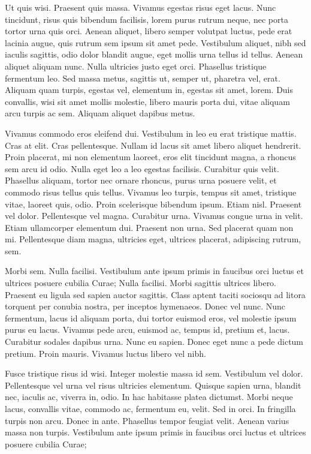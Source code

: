 \documentclass{article}
\begin{document}
Ut quis wisi. Praesent quis massa. Vivamus egestas risus eget lacus. Nunc
tincidunt, risus quis bibendum facilisis, lorem purus rutrum neque, nec porta
tortor urna quis orci. Aenean aliquet, libero semper volutpat luctus, pede erat
lacinia augue, quis rutrum sem ipsum sit amet pede. Vestibulum aliquet, nibh
sed iaculis sagittis, odio dolor blandit augue, eget mollis urna tellus id
tellus. Aenean aliquet aliquam nunc. Nulla ultricies justo eget orci. Phasellus
tristique fermentum leo. Sed massa metus, sagittis ut, semper ut, pharetra vel,
erat. Aliquam quam turpis, egestas vel, elementum in, egestas sit amet, lorem.
Duis convallis, wisi sit amet mollis molestie, libero mauris porta dui, vitae
aliquam arcu turpis ac sem. Aliquam aliquet dapibus metus.

Vivamus commodo eros eleifend dui. Vestibulum in leo eu erat tristique
mattis. Cras at elit. Cras pellentesque. Nullam id lacus sit amet libero
aliquet hendrerit. Proin placerat, mi non elementum laoreet, eros elit
tincidunt magna, a rhoncus sem arcu id odio. Nulla eget leo a leo egestas
facilisis. Curabitur quis velit. Phasellus aliquam, tortor nec ornare rhoncus,
purus urna posuere velit, et commodo risus tellus quis tellus. Vivamus leo
turpis, tempus sit amet, tristique vitae, laoreet quis, odio. Proin scelerisque
bibendum ipsum. Etiam nisl. Praesent vel dolor. Pellentesque vel magna.
Curabitur urna. Vivamus congue urna in velit. Etiam ullamcorper elementum dui.
Praesent non urna. Sed placerat quam non mi. Pellentesque diam magna, ultricies
eget, ultrices placerat, adipiscing rutrum, sem.

Morbi sem. Nulla facilisi. Vestibulum ante ipsum primis in faucibus orci
luctus et ultrices posuere cubilia Curae; Nulla facilisi. Morbi sagittis
ultrices libero. Praesent eu ligula sed sapien auctor sagittis. Class aptent
taciti sociosqu ad litora torquent per conubia nostra, per inceptos hymenaeos.
Donec vel nunc. Nunc fermentum, lacus id aliquam porta, dui tortor euismod
eros, vel molestie ipsum purus eu lacus. Vivamus pede arcu, euismod ac, tempus
id, pretium et, lacus. Curabitur sodales dapibus urna. Nunc eu sapien. Donec
eget nunc a pede dictum pretium. Proin mauris. Vivamus luctus libero vel nibh.

Fusce tristique risus id wisi. Integer molestie massa id sem. Vestibulum vel
dolor. Pellentesque vel urna vel risus ultricies elementum. Quisque sapien
urna, blandit nec, iaculis ac, viverra in, odio. In hac habitasse platea
dictumst. Morbi neque lacus, convallis vitae, commodo ac, fermentum eu, velit.
Sed in orci. In fringilla turpis non arcu. Donec in ante. Phasellus tempor
feugiat velit. Aenean varius massa non turpis. Vestibulum ante ipsum primis in
faucibus orci luctus et ultrices posuere cubilia Curae;
\end{document}
